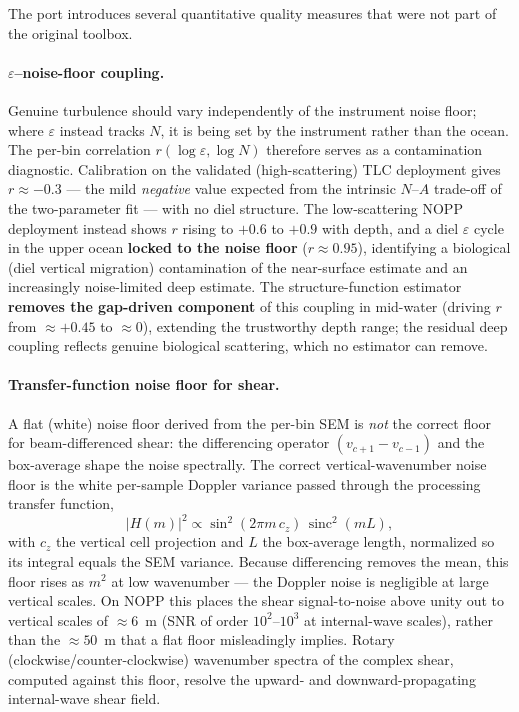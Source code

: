 \documentclass[11pt]{article}
\newcommand{\eps}{\varepsilon}
\begin{document}
The port introduces several quantitative quality measures that were not part of the original
toolbox.

\paragraph{$\eps$--noise-floor coupling.} Genuine turbulence should vary independently of the
instrument noise floor; where $\eps$ instead tracks $N$, it is being set by the instrument
rather than the ocean. The per-bin correlation $r(\log\eps, \log N)$ therefore serves as a
contamination diagnostic. Calibration on the validated (high-scattering) TLC deployment gives
$r \approx -0.3$ --- the mild \emph{negative} value expected from the intrinsic $N$--$A$
trade-off of the two-parameter fit --- with no diel structure. The low-scattering NOPP
deployment instead shows $r$ rising to $+0.6$ to $+0.9$ with depth, and a diel $\eps$ cycle in
the upper ocean \textbf{locked to the noise floor} ($r \approx 0.95$), identifying a biological
(diel vertical migration) contamination of the near-surface estimate and an increasingly
noise-limited deep estimate. The structure-function estimator \textbf{removes the gap-driven
component} of this coupling in mid-water (driving $r$ from $\approx +0.45$ to $\approx 0$),
extending the trustworthy depth range; the residual deep coupling reflects genuine biological
scattering, which no estimator can remove.

\paragraph{Transfer-function noise floor for shear.} A flat (white) noise floor derived from
the per-bin SEM is \emph{not} the correct floor for beam-differenced shear: the differencing
operator $(v_{c+1}-v_{c-1})$ and the box-average shape the noise spectrally. The correct
vertical-wavenumber noise floor is the white per-sample Doppler variance passed through the
processing transfer function,
\begin{equation}
|H(m)|^{2} \propto \sin^{2}\!\left(2\pi m\,c_z\right)\,
\operatorname{sinc}^{2}\!\left(m L\right),
\end{equation}
with $c_z$ the vertical cell projection and $L$ the box-average length, normalized so its
integral equals the SEM variance. Because differencing removes the mean, this floor rises as
$m^{2}$ at low wavenumber --- the Doppler noise is negligible at large vertical scales. On
NOPP this places the shear signal-to-noise above unity out to vertical scales of
$\approx 6$~m (SNR of order $10^{2}$--$10^{3}$ at internal-wave scales), rather than the
$\approx 50$~m that a flat floor misleadingly implies. Rotary (clockwise/counter-clockwise)
wavenumber spectra of the complex shear, computed against this floor, resolve the upward- and
downward-propagating internal-wave shear field.
\end{document}
